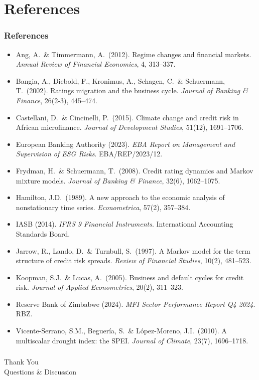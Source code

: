 \documentclass{beamer}
\begin{document}
\section{References}
\begin{frame}[allowframebreaks]
    \frametitle{References}
    \footnotesize
    \begin{itemize}
        \item Ang, A.\ \& Timmermann, A.\ (2012). Regime changes and financial markets. \textit{Annual Review of Financial Economics}, 4, 313--337.
        \item Bangia, A., Diebold, F., Kronimus, A., Schagen, C.\ \& Schuermann, T.\ (2002). Ratings migration and the business cycle. \textit{Journal of Banking \& Finance}, 26(2-3), 445--474.
        \item Castellani, D.\ \& Cincinelli, P.\ (2015). Climate change and credit risk in African microfinance. \textit{Journal of Development Studies}, 51(12), 1691--1706.
        \item European Banking Authority (2023). \textit{EBA Report on Management and Supervision of ESG Risks}. EBA/REP/2023/12.
        \item Frydman, H.\ \& Schuermann, T.\ (2008). Credit rating dynamics and Markov mixture models. \textit{Journal of Banking \& Finance}, 32(6), 1062--1075.
        \item Hamilton, J.D.\ (1989). A new approach to the economic analysis of nonstationary time series. \textit{Econometrica}, 57(2), 357--384.
        \item IASB (2014). \textit{IFRS 9 Financial Instruments}. International Accounting Standards Board.
        \item Jarrow, R., Lando, D.\ \& Turnbull, S.\ (1997). A Markov model for the term structure of credit risk spreads. \textit{Review of Financial Studies}, 10(2), 481--523.
        \item Koopman, S.J.\ \& Lucas, A.\ (2005). Business and default cycles for credit risk. \textit{Journal of Applied Econometrics}, 20(2), 311--323.
        \item Reserve Bank of Zimbabwe (2024). \textit{MFI Sector Performance Report Q4 2024}. RBZ.
        \item Vicente-Serrano, S.M., Beguer\'ia, S.\ \& L\'opez-Moreno, J.I.\ (2010). A multiscalar drought index: the SPEI. \textit{Journal of Climate}, 23(7), 1696--1718.
    \end{itemize}
\end{frame}

\begin{frame}
    \frametitle{}
    \centering
    \Huge{Thank You}\\[0.8cm]
    \Large{Questions \& Discussion}
\end{frame}
\end{document}
